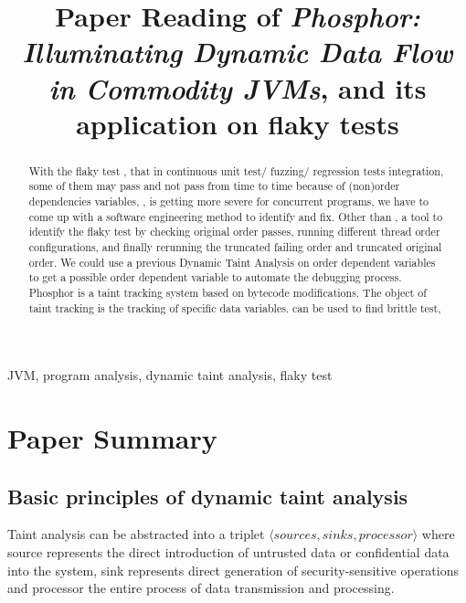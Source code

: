 \documentclass[conference]{IEEEtran}
\begin{document}
\title{Paper Reading of \textit{Phosphor: Illuminating Dynamic Data Flow in Commodity JVMs}, and its application on flaky tests}

\author{
}

\maketitle

\begin{abstract}
    With the flaky test \cite{b6}, that in continuous unit test/ fuzzing/ regression tests integration, some of them may pass and not pass from time to time because of (non)order dependencies variables, , is getting more severe for concurrent programs, we have to come up with a software engineering method to identify and fix.
    Other than \cite{b2}, a tool to identify the flaky test by checking original order passes, running different thread order configurations, and finally rerunning the truncated failing order and truncated original order. We could use a previous Dynamic Taint Analysis on order dependent variables to get a possible order dependent variable to automate the debugging process.
    Phosphor \cite{b1} is a taint tracking system based on bytecode modifications. The object of taint tracking is the tracking of specific data variables. can be used to find brittle test,
\end{abstract}

\begin{IEEEkeywords}
    JVM, program analysis, dynamic taint analysis, flaky test
\end{IEEEkeywords}

\section{Paper Summary}
\subsection{Basic principles of dynamic taint analysis}
Taint analysis can be abstracted into a triplet $\langle sources, sinks, processor\rangle$ where source represents the direct introduction of untrusted data or confidential data into the system, sink represents direct generation of security-sensitive operations and processor the entire process of data transmission and processing.
\end{document}
